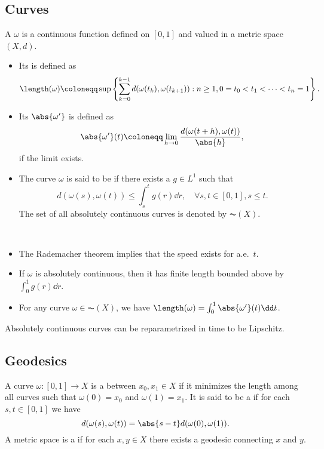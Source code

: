 \documentclass[oneside,reqno,letterpaper]{amsart}
\begin{document}
\subsection{Curves}
\begin{definition}
  A  \(\omega\) is a continuous function defined on \([0, 1]\) and valued in a metric space \((X, d)\).
  \begin{itemize}
    \item Its  is defined as
      \[
        \length(\omega)
        \coloneqq \sup\left\{\sum_{k = 0}^{k - 1} d(\omega(t_k), \omega(t_{k + 1})): n \geq 1, 0 = t_0 < t_1 < \dots < t_n = 1 \right\}.
      \]
    \item Its  \(\abs{\omega'}\) is defined as
      \[
        \abs{\omega'}(t) \coloneqq \lim_{h \to 0} \frac{d(\omega(t + h), \omega(t))}{\abs{h}},
      \]
      if the limit exists.
    \item The curve \(\omega\) is said to be  if there exists a \(g \in L^1\) such that
      \[
        d(\omega(s), \omega(t)) \leq \int_s^t g(r) \dd r, \quad \forall s, t \in [0, 1], s \leq t.
      \]
      The set of all absolutely continuous curves is denoted by \(\AC(X)\).
  \end{itemize}
\end{definition}


\begin{remark}~
  \begin{itemize}
    \item The Rademacher theorem implies that the speed exists for a.e.\ \(t\).
    \item If \(\omega\) is absolutely continuous, then it has finite length bounded above by \(\int_0^1 g(r) \dd r\).
      \item For any curve \(\omega \in \AC(X)\), we have \(\length(\omega) = \int_0^1 \abs{\omega'}(t) \dd t\).
  \end{itemize}
\end{remark}


\begin{proposition}
  Absolutely continuous curves can be reparametrized in time to be Lipschitz.
\end{proposition}


\subsection{Geodesics}

\begin{definition}
  A curve \(\omega: [0, 1] \to X\) is a  between \(x_0, x_1 \in X\) if it minimizes the length among all curves such that \(\omega(0) = x_0\) and \(\omega(1) = x_1\).
  It is said to be a  if for each \(s, t \in [0, 1]\) we have
  \[
    d(\omega(s), \omega(t)) = \abs{s - t} d(\omega(0), \omega(1)).
  \]
  A metric space is a  if for each \(x, y \in X\) there exists a geodesic connecting \(x\) and \(y\).
\end{definition}
\end{document}
